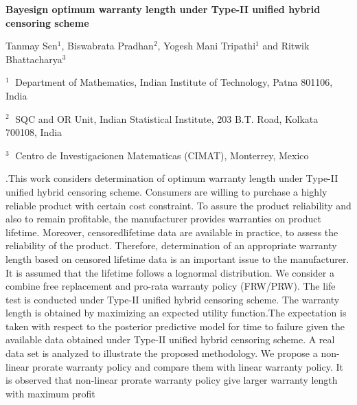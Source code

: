 \documentclass[12pt]{article}
\begin{document}
\begin{flushleft}


{\LARGE\bf Bayesign optimum   warranty length  under Type-II unified hybrid censoring scheme}


\vspace{1.0cm}

Tanmay Sen$^1$, Biswabrata Pradhan$^2$, Yogesh Mani Tripathi$^{1}$ and Ritwik Bhattacharya$^{3}$

\begin{description}

\item $^1 \;$ Department of Mathematics, Indian Institute of Technology, Patna 801106, India 
\item $^2 \;$ SQC and OR Unit, Indian Statistical Institute, 203 B.T. Road, Kolkata 700108, India 
\item $^3 \;$ Centro de Investigacionen Matematicas (CIMAT), Monterrey, Mexico 

\end{description}

\end{flushleft}


\vspace{0.75cm}

.This work considers determination of optimum warranty length under Type-II unified hybrid censoring scheme. Consumers are willing to purchase a highly reliable product with certain cost constraint. To assure the product reliability and also to remain profitable, the manufacturer provides warranties on product lifetime. Moreover, censoredlifetime data are available in practice, to assess the reliability of the product. Therefore, determination of an appropriate warranty length based on censored lifetime data is an important issue to the manufacturer.  It is assumed that the lifetime follows a lognormal distribution.  We consider a combine free replacement and pro-rata warranty policy (FRW/PRW). The life test is conducted under Type-II unified hybrid censoring scheme.  The warranty length is obtained by maximizing an expected utility function.The expectation is taken with respect to the posterior predictive model for time to failure given the available data obtained under Type-II unified hybrid censoring scheme. A real data set is analyzed to illustrate the proposed methodology.  We propose a non-linear prorate warranty policy and compare them with linear warranty policy.  It is observed that non-linear prorate warranty policy give larger warranty length with maximum profit
\end{document}
